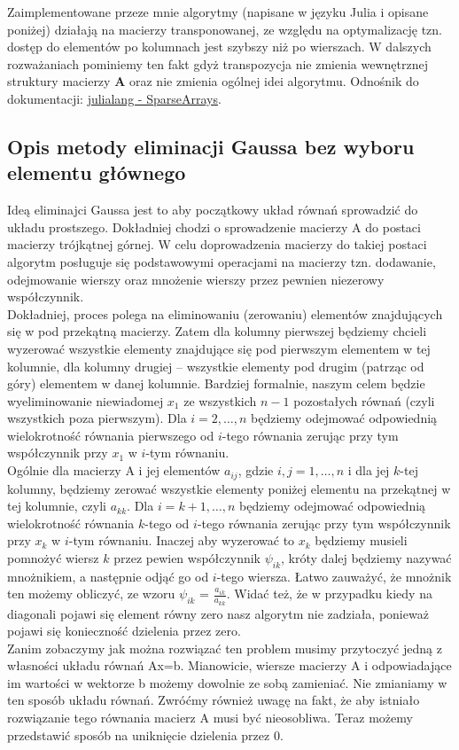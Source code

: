 \documentclass[]{article}
\newcommand{\mA}{\bm{A}}
\begin{document}
	\noindent Zaimplementowane przeze mnie algorytmy (napisane w języku Julia i opisane poniżej) działają na macierzy transponowanej, ze względu na optymalizację tzn. dostęp do elementów po kolumnach jest szybszy niż po wierszach. W dalszych rozważaniach pominiemy ten fakt gdyż transpozycja nie zmienia wewnętrznej struktury macierzy $\mA$ oraz nie zmienia ogólnej idei algorytmu.
	Odnośnik do dokumentacji: 
	\href{https://docs.julialang.org/en/v1/stdlib/SparseArrays/}{julialang - SparseArrays}.
	

	\subsection*{Opis metody eliminacji Gaussa bez wyboru elementu głównego}
	Ideą eliminajci Gaussa jest to aby początkowy układ równań sprowadzić do układu prostszego. Dokładniej chodzi o sprowadzenie macierzy A do postaci macierzy trójkątnej górnej. W celu doprowadzenia macierzy do takiej postaci algorytm posługuje się podstawowymi operacjami na macierzy tzn. dodawanie, odejmowanie wierszy oraz mnożenie wierszy przez pewnien niezerowy współczynnik. \\
	Dokładniej, proces polega na eliminowaniu (zerowaniu) elementów znajdujących się w pod przekątną macierzy.
	Zatem dla kolumny pierwszej będziemy chcieli wyzerować wszystkie elementy znajdujące się pod pierwszym elementem w tej kolumnie, dla kolumny drugiej -- wszystkie elementy pod drugim (patrząc od góry) elementem w danej kolumnie. Bardziej formalnie, naszym celem będzie wyeliminowanie niewiadomej $x_1$ ze wszystkich $n-1$ pozostałych równań (czyli wszystkich poza pierwszym). Dla $i = 2,\ldots,n$ będziemy odejmować odpowiednią wielokrotność równania pierwszego od $i$-tego równania zerując przy tym współczynnik przy $x_1$ w $i$-tym równaniu. \\
	Ogólnie dla macierzy A i jej elementów $a_{ij}$, gdzie $i,j = 1,\ldots,n$ i dla jej $k$-tej kolumny, będziemy zerować wszystkie elementy poniżej elementu na przekątnej w tej kolumnie, czyli $a_{kk}$. Dla $i = k+1,\ldots,n$ będziemy odejmować odpowiednią wielokrotność równania $k$-tego od $i$-tego równania zerując przy tym współczynnik przy $x_k$ w $i$-tym równaniu. Inaczej aby wyzerować to $x_k$ będziemy musieli pomnożyć wiersz $k$ przez pewien współczynnik $\psi_{ik}$, króty dalej będziemy nazywać mnożnikiem, a następnie odjąć go od $i$-tego wiersza. Łatwo zauważyć, że mnożnik ten możemy obliczyć, ze wzoru $\psi_{ik}$ = $\frac{a_{ik}}{a_{kk}}$. Widać też, że w przypadku kiedy na diagonali pojawi się element równy zero nasz algorytm nie zadziała, ponieważ pojawi się konieczność dzielenia przez zero. \\
	Zanim zobaczymy jak można rozwiązać ten problem musimy przytoczyć jedną z własności układu równań Ax=b. Mianowicie, wiersze macierzy A i odpowiadające im wartości w wektorze b możemy dowolnie ze sobą zamieniać. Nie zmianiamy w ten sposób układu równań.
	Zwróćmy również uwagę na fakt, że aby istniało rozwiązanie tego równania macierz A musi być nieosobliwa. 
	Teraz możemy przedstawić sposób na uniknięcie dzielenia przez 0. 
\end{document}
